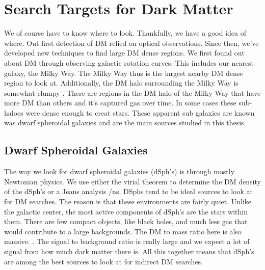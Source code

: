 \section{Search Targets for Dark Matter\label{sec:dm_targets}}
We of course have to know where to look.
Thankfully, we have a good idea of where.
Out first detection of DM relied on optical observations.
Since then, we've developed new techniques to find large DM dense regions.
We first found out about DM through observing galactic rotation curves.
This includes our nearest galaxy, the Milky Way.
The Milky Way thus is the largest nearby DM dense region to look at.
Additionally, the DM halo surrounding the Milky Way is somewhat clumpy \ns.
There are regions in the DM halo of the Milky Way that have more DM than others and it's captured gas over time.
In some cases these sub-haloes were dense enough to creat stars.
These apparent sub galaxies are known was dwarf spheroidal galaxies and are the main sources studied in this thesis.

\subsection{Dwarf Spheroidal Galaxies\label{sec:dSphs}}

The way we look for dwarf spheroidal galaxies (dSph's) is through mostly Newtonian physics.
We use either the virial theorem to determine the DM density of the dSph's or a Jeans analysis /ns.
DSphs tend to be ideal sources to look at for DM searches.
The reason is that these environments are fairly quiet.
Unlike the galactic center, the most active components of dSph's are the stars within them.
There are few compact objects, like black holes, and much less gas that would contribute to a large backgrounds.
The DM to mass ratio here is also massive. \ns.
The signal to background ratio is really large and we expect a lot of signal from how much dark matter there is.
All this together means that dSph's are among the best sources to look at for indirect DM searches.
